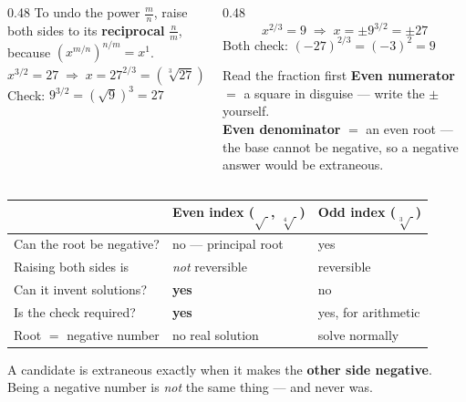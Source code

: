 \documentclass[aspectratio=169, 11pt]{beamer}
\begin{document}
\begin{frame}[t, plain]
  \begin{columns}[T]
    \begin{column}{0.48\textwidth}
      \footnotesize
      To undo the power $\frac{m}{n}$, raise both sides to its \textbf{reciprocal} $\frac{n}{m}$,
      because $\left(x^{m/n}\right)^{n/m}=x^{1}$.
      \vspace{4pt}
      \[ x^{3/2}=27 \;\Rightarrow\; x=27^{2/3}=\left(\sqrt[3]{27}\right)^{2}=9 \]
      Check: $9^{3/2}=\left(\sqrt9\right)^{3}=27$ \checkmark
    \end{column}
    \begin{column}{0.48\textwidth}
      \footnotesize
      \[ x^{2/3}=9 \;\Rightarrow\; x=\pm 9^{3/2}=\pm 27 \]
      Both check: $(-27)^{2/3}=(-3)^{2}=9$ \checkmark
      \vspace{4pt}
      \begin{block}{Read the fraction first}
        \textbf{Even numerator} $=$ a square in disguise --- write the $\pm$ yourself. \\[3pt]
        \textbf{Even denominator} $=$ an even root --- the base cannot be negative, so a negative
        answer would be extraneous.
      \end{block}
    \end{column}
  \end{columns}
\end{frame}

\begin{frame}[t, plain]
  \begin{center}
  \renewcommand{\arraystretch}{1.35}
  \begin{tabular}{lll}
  \hline
   & \textbf{Even index ($\sqrt{\ }$, $\sqrt[4]{\ }$)} & \textbf{Odd index ($\sqrt[3]{\ }$)} \\
  \hline
  Can the root be negative? & no --- principal root & yes \\
  Raising both sides is & \emph{not} reversible & reversible \\
  Can it invent solutions? & \textbf{yes} & no \\
  Is the check required? & \textbf{yes} & yes, for arithmetic \\
  Root $=$ negative number & no real solution & solve normally \\
  \hline
  \end{tabular}
  \end{center}
  \vspace{6pt}
  \begin{center}
    A candidate is extraneous exactly when it makes the \textbf{other side negative}. \\[3pt]
    Being a negative number is \emph{not} the same thing --- and never was.
  \end{center}
\end{frame}
\end{document}

